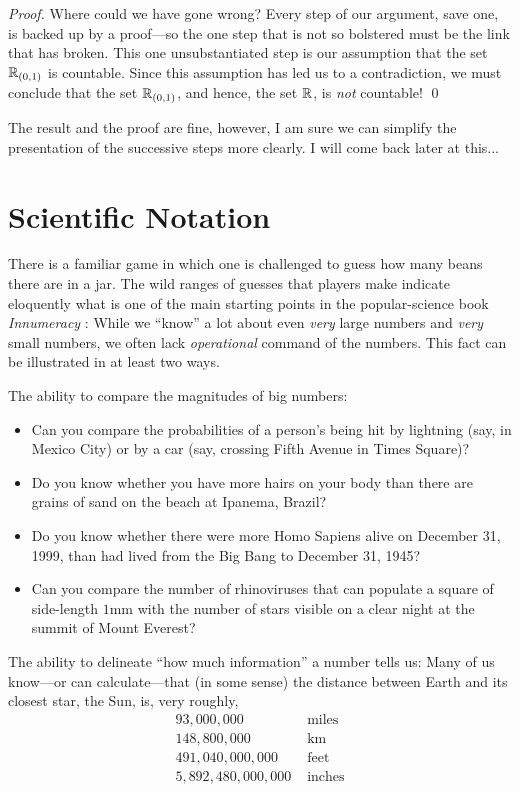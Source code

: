 \begin{proof}
Where could we have gone wrong?  Every step of our argument, save one,
is backed up by a proof---so the one step that is not so bolstered
must be the link that has broken.  This one unsubstantiated step is
our assumption that the set $\mathbb{R}_{(0,1)}$ is countable.  Since this
assumption has led us to a contradiction, we must conclude that the
set $\mathbb{R}_{(0,1)}$, and hence, the set $\mathbb{R}$, is {\em not} countable!
\qed
\end{proof}

{\Denis The result and the proof are fine, however, I am sure we can simplify 
the presentation of the successive steps more clearly. I will come back later at this...
}




\section{Scientific Notation}
\label{sec:scientific-notation}

There is a familiar game in which one is challenged to guess how many
beans there are in a jar. The wild ranges of guesses that players make
indicate eloquently what is one of the main starting points in the
popular-science book {\it Innumeracy} \cite{Paulos}: While we ``know''
a lot about even {\em very} large numbers and {\em very} small
numbers, we often lack {\em operational} command of the numbers.  This
fact can be illustrated in at least two ways.

The ability to compare the magnitudes of big numbers:
\begin{itemize}
\item
Can you compare the probabilities of a person's being hit by lightning
(say, in Mexico City) or by a car (say, crossing Fifth Avenue in Times
Square)?
\item
Do you know whether you have more hairs on your body than there are
grains of sand on the beach at Ipanema, Brazil?
\item

Do you know whether there were more Homo Sapiens alive on December 31,
1999, than had lived from the Big Bang to December 31, 1945?
\item
Can you compare the number of rhinoviruses that can populate a square
of side-length $1$mm with the number of stars visible on a clear night
at the summit of Mount Everest?
\end{itemize}

The ability to delineate ``how much information'' a number tells us:
Many of us know---or can calculate---that (in some sense) the distance
between Earth and its closest star, the Sun, is, very roughly,
\[ \begin{array}{rl}
93,000,000 & \mbox{ miles} \\
148,800,000 & \mbox{ km} \\
491,040,000,000 & \mbox{ feet} \\
5,892,480,000,000 & \mbox{ inches}
\end{array}
\]

